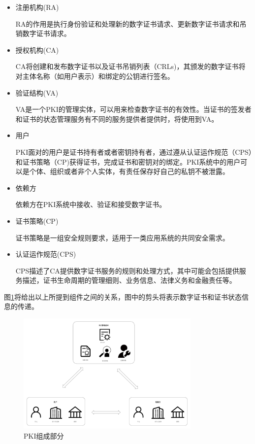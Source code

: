 \begin{itemize}
	\item 

	注册机构(RA)

	RA的作用是执行身份验证和处理新的数字证书请求、更新数字证书请求和吊销数字证书请求。

	\item

	授权机构(CA)

	CA将创建和发布数字证书以及证书吊销列表（CRLs)，其颁发的数字证书将对主体名称（如用户表示）和绑定的公钥进行签名。

	\item

	验证结构(VA)

	VA是一个PKI的管理实体，可以用来检查数字证书的有效性。当证书的签发者和证书的状态管理服务有不同的服务提供者提供时，将使用到VA。

	\item

	用户

	PKI面对的用户是证书持有者或者密钥持有者，通过遵从认证运作规范（CPS）和证书策略（CP)获得证书，完成证书和密钥对的绑定。PKI系统中的用户可以是个体、组织或者非个人实体，有责任保存好自己的私钥不被泄露。

	\item

	依赖方

	依赖方在PKI系统中接收、验证和接受数字证书。

	\item

	证书策略(CP)

	证书策略是一组安全规则要求，适用于一类应用系统的共同安全需求。

	\item

	认证运作规范(CPS)

	CPS描述了CA提供数字证书服务的规则和处理方式，其中可能会包括提供服务描述，证书生命周期的管理细则、业务信息、法律义务和金融责任等。
\end{itemize}

图\ref{fig:pki}将给出以上所提到组件之间的关系，图中的剪头将表示数字证书和证书状态信息的传递。

\begin{figure}[htbp]
 	\centering
 	\includegraphics[width = 0.8\textwidth]{img/pki}
 	\caption{PKI组成部分}\label{fig:pki}
\end{figure}

